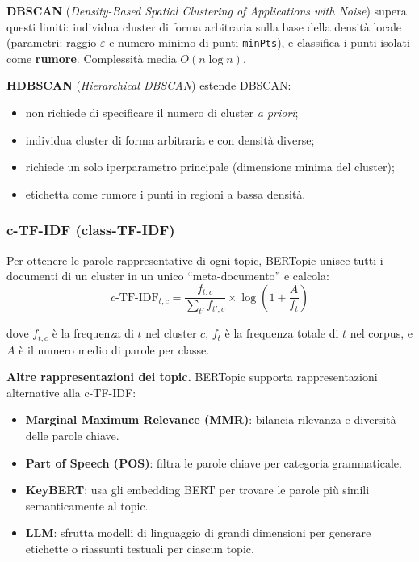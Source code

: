 \documentclass[12pt,a4paper]{article}
\newcommand{\formula}[1]{%
  \begin{equation*}#1\end{equation*}%
}
\begin{document}
\textbf{DBSCAN} (\textit{Density-Based Spatial Clustering of Applications with Noise})
supera questi limiti: individua cluster di forma arbitraria sulla base della densità locale
(parametri: raggio $\varepsilon$ e numero minimo di punti \texttt{minPts}), e classifica i
punti isolati come \textbf{rumore}. Complessità media $O(n \log n)$.

\textbf{HDBSCAN} (\textit{Hierarchical DBSCAN}) estende DBSCAN:
\begin{itemize}
  \item non richiede di specificare il numero di cluster \textit{a priori};
  \item individua cluster di forma arbitraria e con densità diverse;
  \item richiede un solo iperparametro principale (dimensione minima del cluster);
  \item etichetta come rumore i punti in regioni a bassa densità.
\end{itemize}

\subsubsection{c-TF-IDF (class-TF-IDF)}

Per ottenere le parole rappresentative di ogni topic, BERTopic unisce tutti i documenti
di un cluster in un unico ``meta-documento'' e calcola:
\formula{
  c\text{-TF-IDF}_{t,c} = \frac{f_{t,c}}{\sum_{t'} f_{t',c}}
  \times \log\left(1 + \frac{A}{f_t}\right)
}
dove $f_{t,c}$ è la frequenza di $t$ nel cluster $c$, $f_t$ è la frequenza totale di $t$
nel corpus, e $A$ è il numero medio di parole per classe.

\textbf{Altre rappresentazioni dei topic.}
BERTopic supporta rappresentazioni alternative alla c-TF-IDF:
\begin{itemize}
  \item \textbf{Marginal Maximum Relevance (MMR)}: bilancia rilevanza e diversità delle
        parole chiave.
  \item \textbf{Part of Speech (POS)}: filtra le parole chiave per categoria grammaticale.
  \item \textbf{KeyBERT}: usa gli embedding BERT per trovare le parole più simili
        semanticamente al topic.
  \item \textbf{LLM}: sfrutta modelli di linguaggio di grandi dimensioni per generare
        etichette o riassunti testuali per ciascun topic.
\end{itemize}
\end{document}
